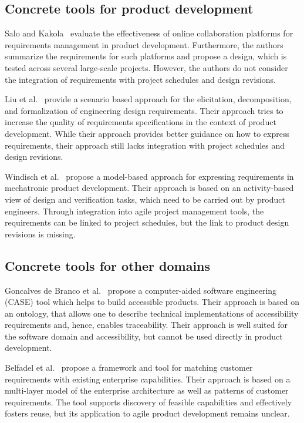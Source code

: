     \subsection*{Concrete tools for product development}
    Salo and Kakola~\cite{Ahti2005} evaluate the effectiveness of online collaboration platforms for requirements management in product development.
    Furthermore, the authors summarize the requirements for such platforms and propose a design, which is tested across several large-scale projects.
    However, the authors do not consider the integration of requirements with project schedules and design revisions.
    
    Liu et al.~\cite{liu2012scenario} provide a scenario based approach for the elicitation, decomposition, and formalization of engineering design requirements.
    Their approach tries to increase the quality of requirements specifications in the context of product development.
    While their approach provides better guidance on how to express requirements, their approach still lacks integration with project schedules and design revisions.
    
    Windisch et al.~\cite{WINDISCH2022550} propose a model-based approach for expressing requirements in mechatronic product development.
    Their approach is based on an activity-based view of design and verification tasks, which need to be carried out by product engineers.
    Through integration into agile project management tools, the requirements can be linked to project schedules, but the link to product design revisions is missing.
    
    \subsection*{Concrete tools for other domains}
    Goncalves de Branco et al.~\cite{6976693} propose a computer-aided software engineering (CASE) tool which helps to build accessible products.
    Their approach is based on an ontology, that allows one to describe technical implementations of accessibility requirements and, hence, enables traceability.
    Their approach is well suited for the software domain and accessibility, but cannot be used directly in product development.
    
    Belfadel et al.~\cite{belfadel2022requirements} propose a framework and tool for matching customer requirements with existing enterprise capabilities.
    Their approach is based on a multi-layer model of the enterprise architecture as well as patterns of customer requirements.
    The tool supports discovery of feasible capabilities and effectively fosters reuse, but its application to agile product development remains unclear.
    

